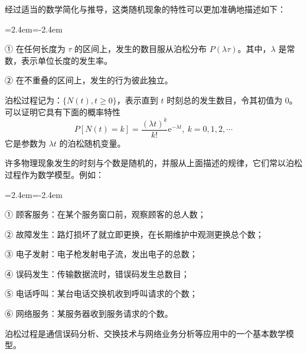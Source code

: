 \documentclass[11pt,openany,UTF8]{ctexbook}
\newcommand{\eu}{\mathrm{e}}                       %
\newenvironment{citemize}
  {\begin{list}{}{\leftmargin=2.4em\itemindent=-2.4em\itemsep=1pt\topsep=3pt\parsep=0pt}}
  {\end{list}}
\begin{document}
经过适当的数学简化与推导\nobreak，这类随机现象的特性可以更加准确地描述如下\nobreak：

\begin{citemize}
\item ① 在任何长度为 $\tau$ 的区间上\nobreak，发生的数目服从泊松分布 $P(\lambda\tau)$\nobreak。其中\nobreak，$\lambda$ 是常数\nobreak，表示单位长度的发生率\nobreak。
\item ② 在不重叠的区间上\nobreak，发生的行为彼此独立\nobreak。
\end{citemize}

泊松过程记为\nobreak：$\{N(t),t\geqslant 0\}$\nobreak，表示直到 $t$ 时刻总的发生数目\nobreak，令其初值为 0\nobreak。可以证明它具有下面的概率特性
\begin{equation}
P[N(t)=k]=\frac{(\lambda t)^k}{k!}\eu^{-\lambda t},\ k=0,1,2,\cdots
\label{eq:2.14}
\end{equation}
它是参数为 $\lambda t$ 的泊松随机变量\nobreak。

许多物理现象发生的时刻与个数是随机的\nobreak，并服从上面描述的规律\nobreak，它们常以泊松过程作为数学模型\nobreak。例如\nobreak：

\begin{citemize}
\item ① 顾客服务\nobreak：在某个服务窗口前\nobreak，观察顾客的总人数\nobreak；
\item ② 故障发生\nobreak：路灯损坏了就立即更换\nobreak，在长期维护中观测更换总个数\nobreak；
\item ③ 电子发射\nobreak：电子枪发射电子流\nobreak，发出电子的总数\nobreak；
\item ④ 误码发生\nobreak：传输数据流时\nobreak，错误码发生总数目\nobreak；
\item ⑤ 电话呼叫\nobreak：某台电话交换机收到呼叫请求的个数\nobreak；
\item ⑥ 网络服务\nobreak：某服务器收到服务请求的个数\nobreak。
\end{citemize}

泊松过程是通信误码分析\nobreak、交换技术与网络业务分析等应用中的一个基本数学模型\nobreak。
\end{document}
